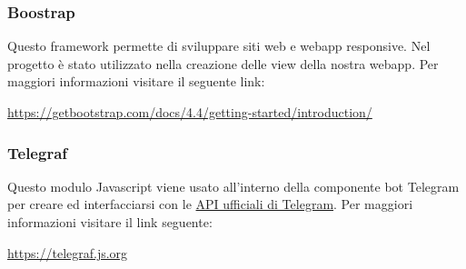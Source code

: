 		\subsubsection{Boostrap}
			Questo framework permette di sviluppare siti web e webapp responsive. Nel progetto è stato utilizzato nella creazione delle view della nostra webapp.
			\newline
			Per maggiori informazioni visitare il seguente link:
			\newline
			\begin{center}
				\url{https://getbootstrap.com/docs/4.4/getting-started/introduction/}
			\end{center}	
		\subsubsection{Telegraf}
			Questo modulo Javascript viene usato all'interno della componente bot Telegram per creare ed interfacciarsi con le \href{https://core.telegram.org/bots/api}{API ufficiali di Telegram}.
			\newline
			Per maggiori informazioni visitare il link seguente:
			\newline
			\begin{center}
				\url{https://telegraf.js.org}
			\end{center}
	